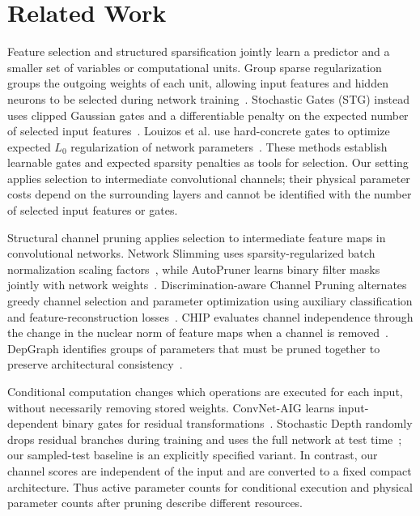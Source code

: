 \documentclass[sigplan,screen]{acmart}
\begin{document}
\section{Related Work}
\label{sec:related-work}

Feature selection and structured sparsification jointly learn a predictor
and a smaller set of variables or computational units. Group sparse
regularization groups the outgoing weights of each unit, allowing input
features and hidden neurons to be selected during network
training~\cite{scardapane2017group}. Stochastic Gates (STG) instead uses
clipped Gaussian gates and a differentiable penalty on the expected
number of selected input features~\cite{yamada2020feature}. Louizos et al.
use hard-concrete gates to optimize expected $L_0$ regularization of
network parameters~\cite{louizos2018learning}. These methods establish
learnable gates and expected sparsity penalties as tools for selection.
Our setting applies selection to intermediate convolutional channels;
their physical parameter costs depend on the surrounding layers and
cannot be identified with the number of selected input features or gates.

Structural channel pruning applies selection to intermediate feature maps
in convolutional networks. Network Slimming uses sparsity-regularized
batch normalization scaling factors~\cite{liu2017network}, while
AutoPruner learns binary filter masks jointly with network
weights~\cite{luo2020autopruner}. Discrimination-aware Channel Pruning
alternates greedy channel selection and parameter optimization using
auxiliary classification and feature-reconstruction
losses~\cite{zhuang2018discrimination}. CHIP evaluates channel independence
through the change in the nuclear norm of feature maps when a channel is
removed~\cite{sui2021chip}. DepGraph identifies groups of parameters that
must be pruned together to preserve architectural
consistency~\cite{fang2023depgraph}.

Conditional computation changes which operations are executed for each
input, without necessarily removing stored weights. ConvNet-AIG learns
input-dependent binary gates for residual
transformations~\cite{veit2018convnet}. Stochastic Depth randomly drops
residual branches during training and uses the full network at test
time~\cite{huang2016deep}; our sampled-test baseline is an explicitly
specified variant. In contrast, our channel scores are independent of
the input and are converted to a fixed compact architecture. Thus active
parameter counts for conditional execution and physical parameter counts
after pruning describe different resources.
\end{document}
